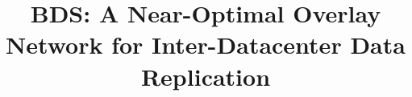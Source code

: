 \documentclass[preprint]{sigplanconf-eurosys}
\newcommand{\name}{BDS\xspace}
\begin{document}
\title{\name: A Near-Optimal Overlay Network for Inter-Datacenter Data Replication}



\maketitle





%


%
%


%



%

%
%

%


%
%









\end{document}
